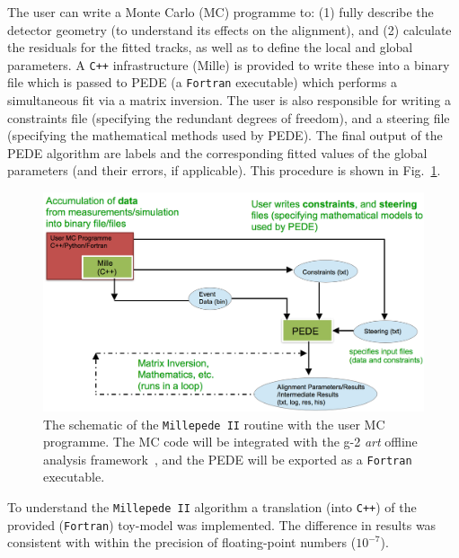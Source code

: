 \documentclass[a4paper,11pt]{article}
\begin{document}
The user can write a Monte Carlo (MC) programme to: (1) fully describe the detector geometry (to understand its effects on the alignment), and (2) calculate the residuals for the fitted tracks, as well as to define the local and global parameters. A \texttt{C++} infrastructure (Mille) is provided to write these into a binary file which is passed to PEDE (a \texttt{Fortran} executable) which performs a simultaneous fit via a matrix inversion. The user is also responsible for writing a constraints file (specifying the redundant degrees of freedom), and a steering file (specifying the mathematical methods used by PEDE). The final output of the PEDE algorithm are labels and the corresponding fitted values of the global parameters (and their errors, if applicable). This procedure is shown in Fig.~\ref{fig:mp2}.
\begin{figure}[!ht]
	\centering
	\includegraphics[scale = 0.4]{fig/MP2.png}
	\caption{The schematic of the \texttt{Millepede II} routine with the user MC programme. The MC code will be integrated with the g-2 \textit{art} offline analysis framework~\cite{art}, and the PEDE will be exported as a \texttt{Fortran} executable.}
	\label{fig:mp2}
\end{figure}
\vspace{-0.2cm}

To understand the \texttt{Millepede II} algorithm a translation (into \texttt{C++}) of the provided (\texttt{Fortran}) toy-model was implemented. The difference in results was consistent with within the precision of  floating-point numbers ($10^{-7}$).
\vspace{-0.1cm}
\end{document}

